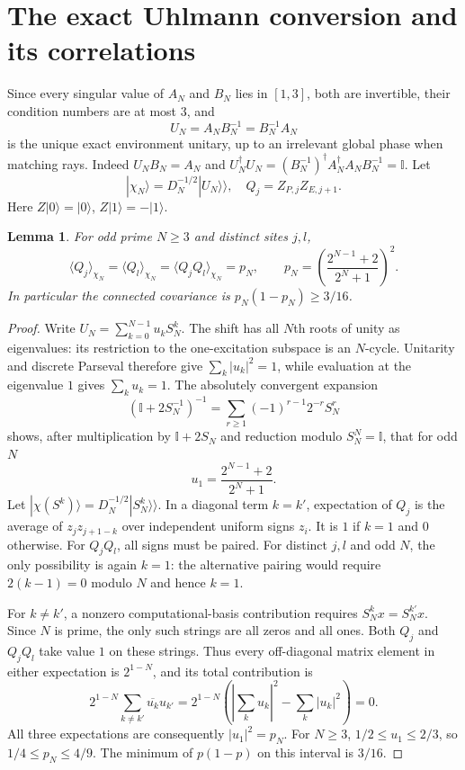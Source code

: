 \documentclass[11pt]{article}
\newtheorem{lemma}{Lemma}
\newcommand{\Id}{\mathbb I}
\begin{document}
\section{The exact Uhlmann conversion and its correlations}
Since every singular value of $A_N$ and $B_N$ lies in $[1,3]$, both are invertible, their condition numbers are at most $3$, and
\[
 U_N=A_NB_N^{-1}=B_N^{-1}A_N
\]
is the unique exact environment unitary, up to an irrelevant global phase when matching rays. Indeed $U_NB_N=A_N$ and
$U_N^\dagger U_N=(B_N^{-1})^\dagger A_N^\dagger A_NB_N^{-1}=\Id$.
Let
\[
 |\chi_N\rangle=D_N^{-1/2}|U_N\rangle\!\rangle,
 \quad Q_j=Z_{P,j}Z_{E,j+1}.
\]
Here $Z|0\rangle=|0\rangle$, $Z|1\rangle=-|1\rangle$.

\begin{lemma}
For odd prime $N\ge3$ and distinct sites $j,l$,
\[
 \langle Q_j\rangle_{\chi_N}=\langle Q_l\rangle_{\chi_N}
 =\langle Q_jQ_l\rangle_{\chi_N}=p_N,
 \qquad
 p_N=\left(\frac{2^{N-1}+2}{2^N+1}\right)^2.
\]
In particular the connected covariance is $p_N(1-p_N)\ge3/16$.
\end{lemma}
\begin{proof}
Write $U_N=\sum_{k=0}^{N-1}u_kS_N^k$. The shift has all $N$th roots of unity as eigenvalues: its restriction to the one-excitation subspace is an $N$-cycle. Unitarity and discrete Parseval therefore give $\sum_k|u_k|^2=1$, while evaluation at the eigenvalue $1$ gives $\sum_k u_k=1$.
The absolutely convergent expansion
\[
 (\Id+2S_N^{-1})^{-1}
 =\sum_{r\ge1}(-1)^{r-1}2^{-r}S_N^r
\]
shows, after multiplication by $\Id+2S_N$ and reduction modulo $S_N^N=\Id$, that for odd $N$
\[
 u_1=\frac{2^{N-1}+2}{2^N+1}.
\]
Let $|\chi(S^k)\rangle=D_N^{-1/2}|S_N^k\rangle\!\rangle$.
In a diagonal term $k=k'$, expectation of $Q_j$ is the average of $z_jz_{j+1-k}$ over independent uniform signs $z_i$. It is $1$ if $k=1$ and $0$ otherwise. For $Q_jQ_l$, all signs must be paired. For distinct $j,l$ and odd $N$, the only possibility is again $k=1$: the alternative pairing would require $2(k-1)=0$ modulo $N$ and hence $k=1$.

For $k\ne k'$, a nonzero computational-basis contribution requires $S_N^kx=S_N^{k'}x$. Since $N$ is prime, the only such strings are all zeros and all ones. Both $Q_j$ and $Q_jQ_l$ take value $1$ on these strings. Thus every off-diagonal matrix element in either expectation is $2^{1-N}$, and its total contribution is
\[
 2^{1-N}\sum_{k\ne k'}\overline{u_k}u_{k'}
 =2^{1-N}\left(\left|\sum_ku_k\right|^2-\sum_k|u_k|^2\right)=0.
\]
All three expectations are consequently $|u_1|^2=p_N$.
For $N\ge3$, $1/2\le u_1\le2/3$, so $1/4\le p_N\le4/9$. The minimum of $p(1-p)$ on this interval is $3/16$.
\end{proof}
\end{document}
